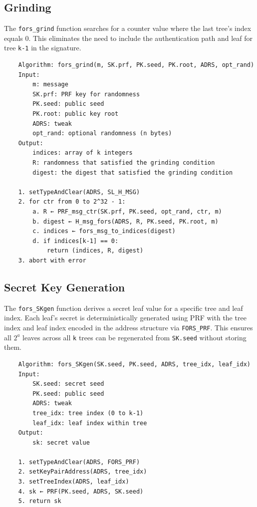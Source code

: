 \subsection{Grinding}
The \texttt{fors\_grind} function searches for a counter value where the last tree's index equals 0. This eliminates the need to include the authentication path and leaf for tree \texttt{k-1} in the signature.
\begin{verbatim}
    Algorithm: fors_grind(m, SK.prf, PK.seed, PK.root, ADRS, opt_rand)
    Input:
        m: message
        SK.prf: PRF key for randomness
        PK.seed: public seed
        PK.root: public key root
        ADRS: tweak
        opt_rand: optional randomness (n bytes)
    Output:
        indices: array of k integers
        R: randomness that satisfied the grinding condition
        digest: the digest that satisfied the grinding condition

    1. setTypeAndClear(ADRS, SL_H_MSG)
    2. for ctr from 0 to 2^32 - 1:
        a. R ← PRF_msg_ctr(SK.prf, PK.seed, opt_rand, ctr, m)
        b. digest ← H_msg_fors(ADRS, R, PK.seed, PK.root, m)
        c. indices ← fors_msg_to_indices(digest)
        d. if indices[k-1] == 0:
            return (indices, R, digest)
    3. abort with error
\end{verbatim}

\subsection{Secret Key Generation}
The \texttt{fors\_SKgen} function derives a secret leaf value for a specific tree and leaf index. Each leaf's secret is deterministically generated using PRF with the tree index and leaf index encoded in the address structure via \texttt{FORS\_PRF}. This ensures all $2^a$ leaves across all \texttt{k} trees can be regenerated from \texttt{SK.seed} without storing them.
\begin{verbatim}
    Algorithm: fors_SKgen(SK.seed, PK.seed, ADRS, tree_idx, leaf_idx)
    Input:
        SK.seed: secret seed
        PK.seed: public seed
        ADRS: tweak
        tree_idx: tree index (0 to k-1)
        leaf_idx: leaf index within tree
    Output:
        sk: secret value

    1. setTypeAndClear(ADRS, FORS_PRF)
    2. setKeyPairAddress(ADRS, tree_idx)
    3. setTreeIndex(ADRS, leaf_idx)
    4. sk ← PRF(PK.seed, ADRS, SK.seed)
    5. return sk
\end{verbatim}

